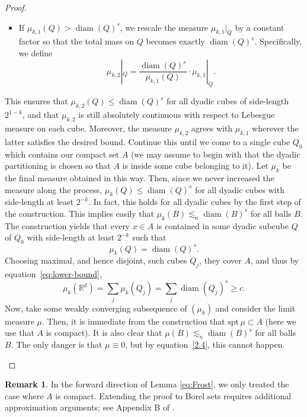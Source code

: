 \documentclass[12pt,a4paper]{report}
\theoremstyle{definition}
\newtheorem{remark}{Remark}
\begin{document}
\begin{proof}
\begin{enumerate}
\begin{itemize}
    \item If \( \mu_{k,1}(Q) > \operatorname{diam}(Q)^s \), we rescale the measure \( \mu_{k,1}|_Q \) by a constant factor so that the total mass on \( Q \) becomes exactly \( \operatorname{diam}(Q)^s \). Specifically, we define
    \[
    \mu_{k,2}|_Q = \frac{\operatorname{diam}(Q)^s}{\mu_{k,1}(Q)} \cdot \mu_{k,1}|_Q.
    \]
\end{itemize}
This ensures that \( \mu_{k,2}(Q) \leq \operatorname{diam}(Q)^s \) for all dyadic cubes of side-length \( 2^{1-k} \), and that \( \mu_{k,2} \) is still absolutely continuous with respect to Lebesgue measure on each cube. Moreover, the measure \( \mu_{k,2} \) agrees with \( \mu_{k,1} \) wherever the latter satisfies the desired bound. Continue this until we come to a single cube \( Q_0 \) which contains our compact set \( A \) (we may assume to begin with that the dyadic partitioning is chosen so that \( A \) is inside some cube belonging to it). Let \( \mu_k \) be the final measure obtained in this way. Then, since we never increased the measure along the process, \( \mu_k(Q) \leq \operatorname{diam}(Q)^s \) for all dyadic cubes with side-length at least \( 2^{-k} \). In fact, this holds for all dyadic cubes by the first step of the construction. This implies easily that \( \mu_k(B) \lesssim_n \operatorname{diam}(B)^s \) for all balls \( B \). The construction yields that every \( x \in A \) is contained in some dyadic subcube \( Q \) of \( Q_0 \) with side-length at least \( 2^{-k} \) such that
\[
\mu_k(Q) = \operatorname{diam}(Q)^s.
\]
Choosing maximal, and hence disjoint, such cubes \( Q_j \), they cover \( A \), and thus by equation~\eqref{eq:lower-bound},
\begin{equation}
\mu_k(\mathbb{R}^d) = \sum_j \mu_k(Q_j) = \sum_j \operatorname{diam}(Q_j)^s \geq c.
\label{2.4}
\end{equation}
Now, take some weakly converging subsequence of \( (\mu_k) \) and consider the limit measure \( \mu \). Then, it is immediate from the construction that \( \mathrm{spt}\, \mu \subset A \) (here we use that \( A \) is compact). It is also clear that \( \mu(B) \lesssim_n \operatorname{diam}(B)^s \) for all balls \( B \). The only danger is that \( \mu \equiv 0 \), but by equation~\eqref{2.4}, this cannot happen.
\end{enumerate}
\end{proof}

\begin{remark}
In the forward direction of Lemma \ref{eq:Frost}, we only treated the case where \( A \) is compact. Extending the proof to Borel sets requires additional approximation arguments; see Appendix B of \cite{bishopperes2017fractals}.
\end{remark}
\end{document}
